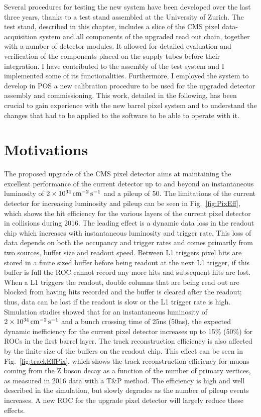 Several procedures for testing the new system have been developed over the last three years, thanks to a test stand assembled at the University of Zurich. The test stand, described in this chapter, includes a slice of the CMS pixel data-acquisition system and all components of the upgraded read out chain, together with a number of detector modules. It allowed for detailed evaluation and verification of the components placed on the supply tubes before their integration.
I have contributed to the assembly of the test system and I implemented some of its functionalities. Furthermore, I employed the system to develop in POS a new calibration procedure to be used for the upgraded detector assembly and commissioning. This work, detailed in the following, has been crucial to gain experience with the new barrel pixel system and to understand the changes that had to be applied to the software to be able to operate with it.

\section{Motivations}

The proposed upgrade of the CMS pixel detector aims at maintaining the excellent performance of the current detector up to and beyond an instantaneous luminosity of $2\times10^{34}\,\text{cm}^\text{$-$2}\,\text{s}^\text{$-$1}$ and a pileup of 50.
The limitations of the current detector for increasing luminosity and pileup can be seen in Fig.~\ref{fig:PixEff}, which shows the hit efficiency for the various layers of the current pixel detector in collisions during 2016.
The leading effect is a dynamic data loss in the readout chip which increases with instantaneous luminosity and trigger rate. This loss of data depends on both the occupancy and trigger rates and comes primarily from two sources, buffer size and readout speed. Between L1 triggers pixel hits are stored in a finite sized buffer before being readout at the next L1 trigger, if this buffer is full the ROC cannot record any more hits and subsequent hits are lost. When a L1 triggers the readout, double columns that are being read out are blocked from having hits recorded and the buffer is cleared after the readout; thus, data can be lost if the readout is slow or the L1 trigger rate is high.
Simulation studies showed that for an instantaneous luminosity of $2\times10^{34}\,\text{cm}^\text{$-$2}\,\text{s}^\text{$-$1}$ and a bunch crossing time of 25\unit{ns} (50\unit{ns}),
the expected dynamic inefficiency for the current pixel detector increases up to 15\% (50\%) for ROCs in the first barrel layer.
The track reconstruction efficiency is also affected by the finite size of the buffers on the readout chip. This effect can be seen in Fig.~\ref{fig:trackEffPix}, which shows the track reconstruction efficiency for muons coming from the Z boson decay as a function of the number of primary vertices, as measured in 2016 data with a T\&P method. The efficiency is high and well described in the simulation, but slowly degrades as the number of pileup events increases.
A new ROC for the upgrade pixel detector will largely reduce these effects.\\

